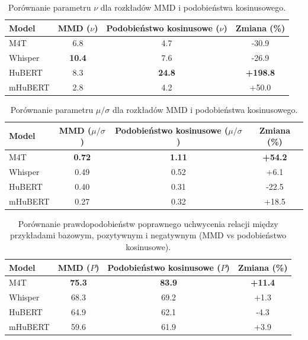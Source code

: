 \begin{table}[!htbp]
\centering
\begin{tabular}{lccc}
\toprule
Model & MMD ($\nu$) & Podobieństwo kosinusowe ($\nu$) & Zmiana (\%) \\
\midrule
M4T     & 6.8  & 4.7  & -30.9 \\
Whisper & \textbf{10.4} & 7.6  & -26.9 \\
HuBERT  & 8.3  & \textbf{24.8} & \textbf{+198.8} \\
mHuBERT & 2.8  & 4.2  & +50.0 \\
\bottomrule
\end{tabular}
\caption{Porównanie parametru $\nu$ dla rozkładów MMD i podobieństwa kosinusowego.}
\label{tab:latent:cosCompNu}
\end{table}

\begin{table}[!htbp]
\centering
\begin{tabular}{lccc}
\toprule
Model & MMD ($\mu/\sigma$) & Podobieństwo kosinusowe ($\mu/\sigma$) & Zmiana (\%) \\
\midrule
M4T     & \textbf{0.72} & \textbf{1.11} & \textbf{+54.2} \\
Whisper & 0.49 & 0.52 & +6.1 \\
HuBERT  & 0.40 & 0.31 & -22.5 \\
mHuBERT & 0.27 & 0.32 & +18.5 \\
\bottomrule
\end{tabular}
\caption{Porównanie parametru $\mu/\sigma$ dla rozkładów MMD i podobieństwa kosinusowego.}
\label{tab:latent:cosineComparisonSeparability}
\end{table}

\begin{table}[!htbp]
\centering
\begin{tabular}{lccc}
\toprule
Model & MMD ($P$) & Podobieństwo kosinusowe ($P$) & Zmiana (\%) \\
\midrule
M4T     & \textbf{75.3} & \textbf{83.9} & \textbf{+11.4} \\
Whisper & 68.3 & 69.2 & +1.3 \\
HuBERT  & 64.9 & 62.1 & -4.3 \\
mHuBERT & 59.6 & 61.9 & +3.9 \\
\bottomrule
\end{tabular}
\caption{Porównanie prawdopodobieństw poprawnego uchwycenia relacji między przykładami bazowym, pozytywnym i negatywnym (MMD vs podobieństwo kosinusowe).}
\label{tab:latent:cosComparisonProbability}
\end{table}

